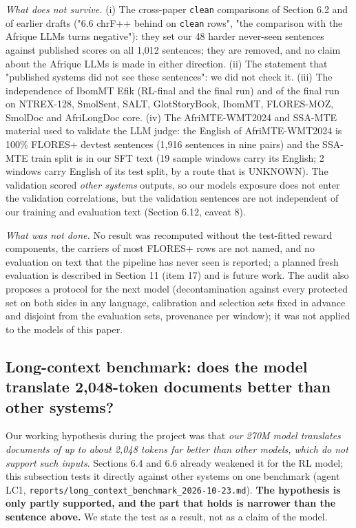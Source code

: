 \emph{What does not survive.} (i) The cross-paper \texttt{clean} comparisons of Section 6.2 and of earlier drafts ("6.6 chrF++ behind on \texttt{clean} rows", "the comparison with the Afrique LLMs turns negative"): they set our 48 harder never-seen sentences against published scores on all 1,012 sentences; they are removed, and no claim about the Afrique LLMs is made in either direction. (ii) The statement that "published systems did not see these sentences": we did not check it. (iii) The independence of IbomMT Efik (RL-final and the final run) and of the final run on NTREX-128, SmolSent, SALT, GlotStoryBook, IbomMT, FLORES-MOZ, SmolDoc and AfriLongDoc core. (iv) The AfriMTE-WMT2024 and SSA-MTE material used to validate the LLM judge: the English of AfriMTE-WMT2024 is 100\% FLORES+ devtest sentences (1,916 sentences in nine pairs) and the SSA-MTE train split is in our SFT text (19 sample windows carry its English; 2 windows carry English of its test split, by a route that is UNKNOWN). The validation scored \emph{other systems\textquotesingle{}} outputs, so our models\textquotesingle{} exposure does not enter the validation correlations, but the validation sentences are not independent of our training and evaluation text (Section 6.12, caveat 8).

\emph{What was not done.} No result was recomputed without the test-fitted reward components, the carriers of most FLORES+ rows are not named, and no evaluation on text that the pipeline has never seen is reported; a planned fresh evaluation is described in Section 11 (item 17) and is future work. The audit also proposes a protocol for the next model (decontamination against every protected set on both sides in any language, calibration and selection sets fixed in advance and disjoint from the evaluation sets, provenance per window); it was not applied to the models of this paper.

\subsection{Long-context benchmark: does the model translate 2,048-token documents better than other systems?}\label{long-context-benchmark-does-the-model-translate-2048-token-documents-better-than-other-systems}

Our working hypothesis during the project was that \emph{our 270M model translates documents of up to about 2,048 tokens far better than other models, which do not support such inputs}. Sections 6.4 and 6.6 already weakened it for the RL model; this subsection tests it directly against other systems on one benchmark (agent LC1, \texttt{reports/long\_context\_benchmark\_2026-10-23.md}). \textbf{The hypothesis is only partly supported, and the part that holds is narrower than the sentence above.} We state the test as a result, not as a claim of the model.

